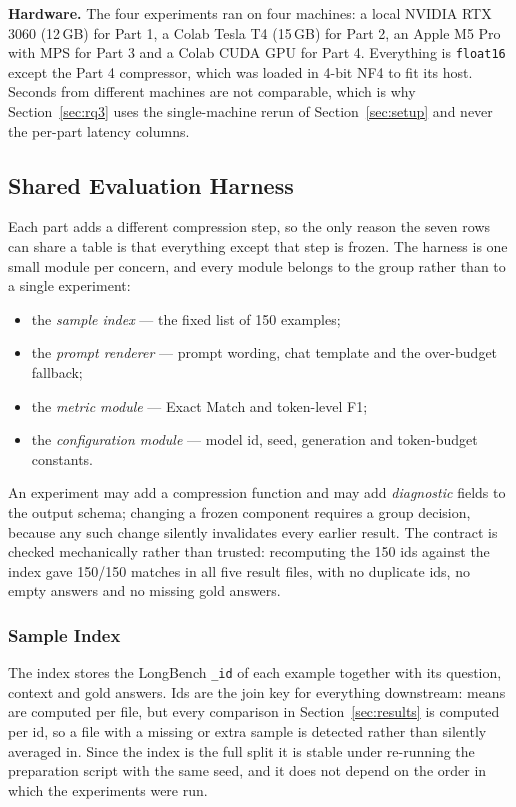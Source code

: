 ﻿\documentclass[10pt,a4paper,twocolumn]{article}
\begin{document}
\textbf{Hardware.} The four experiments ran on four machines: a local NVIDIA RTX
3060 (12\,GB) for Part 1, a Colab Tesla T4 (15\,GB) for Part 2, an Apple M5 Pro
with MPS for Part 3 and a Colab CUDA GPU for Part 4. Everything is
\texttt{float16} except the Part 4 compressor, which was loaded in 4-bit NF4 to
fit its host. Seconds from different machines are not comparable, which is why
Section~\ref{sec:rq3} uses the single-machine rerun of
Section~\ref{sec:setup} and never the per-part latency columns.

\subsection{Shared Evaluation Harness}
\label{sec:harness}

Each part adds a different compression step, so the only reason the seven rows can
share a table is that everything except that step is frozen. The harness is one
small module per concern, and every module belongs to the group rather than to a
single experiment:

\begin{itemize}
  \item the \emph{sample index} --- the fixed list of 150 examples;
  \item the \emph{prompt renderer} --- prompt wording, chat template and the
  over-budget fallback;
  \item the \emph{metric module} --- Exact Match and token-level F1;
  \item the \emph{configuration module} --- model id, seed, generation and
  token-budget constants.
\end{itemize}

An experiment may add a compression function and may add \emph{diagnostic} fields
to the output schema; changing a frozen component requires a group decision, because
any such change silently invalidates every earlier result. The contract is checked
mechanically rather than trusted: recomputing the 150 ids against the index gave
150/150 matches in all five result files, with no duplicate ids, no empty answers
and no missing gold answers.

\subsubsection{Sample Index}

The index stores the LongBench \texttt{\_id} of each example together with its
question, context and gold answers. Ids are the join key for everything
downstream: means are computed per file, but every comparison in
Section~\ref{sec:results} is computed per id, so a file with a missing or extra
sample is detected rather than silently averaged in. Since the index is the full
split it is stable under re-running the preparation script with the same seed,
and it does not depend on the order in which the experiments were run.
\end{document}

